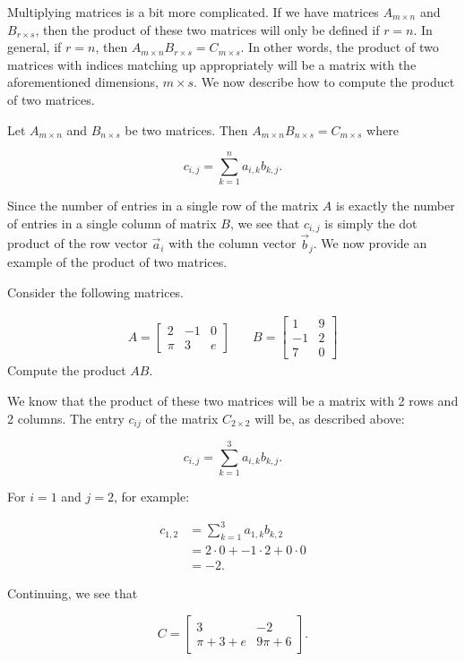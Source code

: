 Multiplying matrices is a bit more complicated.  If we have matrices $A_{m\times n}$ and $B_{r\times s}$, then the product of these two matrices will only be defined if $r=n$.  In general, if $r=n$, then $A_{m\times n}B_{r\times s} = C_{m\times s}$.  In other words, the product of two matrices with indices matching up appropriately will be a matrix with the aforementioned dimensions, $m\times s$.  We now describe how to compute the product of two matrices.

Let $A_{m\times n}$ and $B_{n\times s}$ be two matrices.   Then $A_{m\times n}B_{n\times s} = C_{m\times s}$ where 

\[c_{i,j} = \sum_{k=1}^n a_{i,k}b_{k,j}.\]

Since the number of entries in a single row of the matrix $A$ is exactly the number of entries in a single column of matrix $B$, we see that $c_{i,j}$ is simply the dot product of the row vector $\vec{a}_{i}$ with the column vector $\vec{b}_j$.  We now provide an example of the product of two matrices.\\

{
Consider the following matrices.

\begin{align}
	A = \begin{bmatrix}
		2& -1& 0\\
		\pi & 3& e
	\end{bmatrix}
	&\quad B = \begin{bmatrix}
		1 & 9 \\
		-1 & 2\\
		7 & 0		
	\end{bmatrix}
\end{align}
Compute the product $AB$.
}
{
We know that the product of these two matrices will be a matrix with 2 rows and 2 columns.  The entry $c_{ij}$ of the matrix $C_{2\times 2}$ will be, as described above:

\[c_{i,j} = \sum_{k=1}^3 a_{i,k}b_{k,j}.\]

For $i=1$ and $j=2$, for example:

\begin{align}
c_{1,2} &= \sum_{k=1}^3 a_{1,k}b_{k, 2}\\	
			 &= 2\cdot 0+ -1\cdot 2+0\cdot 0 \\
			 &= -2.
\end{align}

Continuing, we see that

\[C=
\begin{bmatrix}
	3 & -2\\
	\pi + 3 +e &9\pi+6
\end{bmatrix}.
\]
}\\

